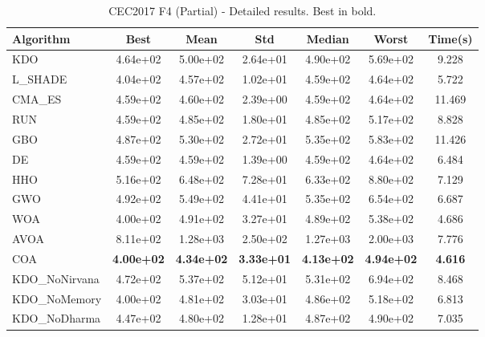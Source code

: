 \begin{table}[H]
\centering\small
\caption{CEC2017 F4 (Partial) - Detailed results. Best in bold.}
\label{tab:cec2017_F4}
\begin{tabular}{lcccccc}
\toprule
\textbf{Algorithm} & \textbf{Best} & \textbf{Mean} & \textbf{Std} & \textbf{Median} & \textbf{Worst} & \textbf{Time(s)} \\
\midrule
KDO & 4.64e+02 & 5.00e+02 & 2.64e+01 & 4.90e+02 & 5.69e+02 & 9.228 \\
L_SHADE & 4.04e+02 & 4.57e+02 & 1.02e+01 & 4.59e+02 & 4.64e+02 & 5.722 \\
CMA_ES & 4.59e+02 & 4.60e+02 & 2.39e+00 & 4.59e+02 & 4.64e+02 & 11.469 \\
RUN & 4.59e+02 & 4.85e+02 & 1.80e+01 & 4.85e+02 & 5.17e+02 & 8.828 \\
GBO & 4.87e+02 & 5.30e+02 & 2.72e+01 & 5.35e+02 & 5.83e+02 & 11.426 \\
DE & 4.59e+02 & 4.59e+02 & 1.39e+00 & 4.59e+02 & 4.64e+02 & 6.484 \\
HHO & 5.16e+02 & 6.48e+02 & 7.28e+01 & 6.33e+02 & 8.80e+02 & 7.129 \\
GWO & 4.92e+02 & 5.49e+02 & 4.41e+01 & 5.35e+02 & 6.54e+02 & 6.687 \\
WOA & 4.00e+02 & 4.91e+02 & 3.27e+01 & 4.89e+02 & 5.38e+02 & 4.686 \\
AVOA & 8.11e+02 & 1.28e+03 & 2.50e+02 & 1.27e+03 & 2.00e+03 & 7.776 \\
COA & \textbf{4.00e+02} & \textbf{4.34e+02} & \textbf{3.33e+01} & \textbf{4.13e+02} & \textbf{4.94e+02} & \textbf{4.616} \\
KDO_NoNirvana & 4.72e+02 & 5.37e+02 & 5.12e+01 & 5.31e+02 & 6.94e+02 & 8.468 \\
KDO_NoMemory & 4.00e+02 & 4.81e+02 & 3.03e+01 & 4.86e+02 & 5.18e+02 & 6.813 \\
KDO_NoDharma & 4.47e+02 & 4.80e+02 & 1.28e+01 & 4.87e+02 & 4.90e+02 & 7.035 \\
\bottomrule
\end{tabular}
\end{table}

